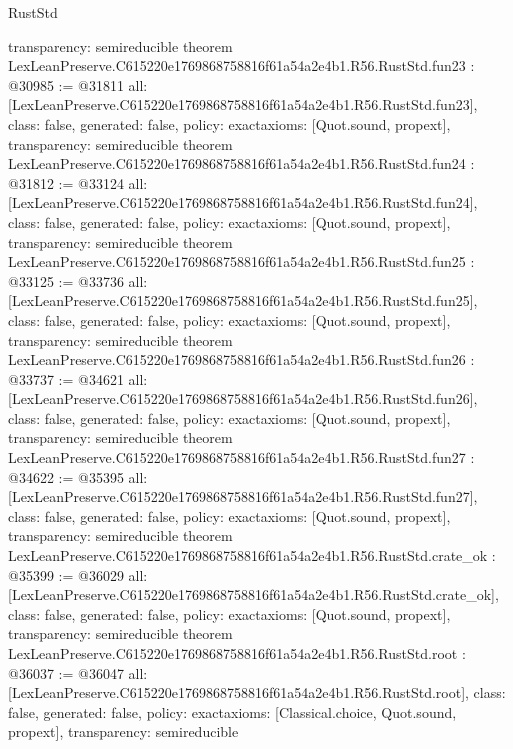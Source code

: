 \begin{lexlean}{RustStd}
\begin{coremodule}
{  transparency: semireducible
}
theorem LexLeanPreserve.C615220e1769868758816f61a54a2e4b1.R56.RustStd.fun23 : @30985 := @31811 {
  all: [LexLeanPreserve.C615220e1769868758816f61a54a2e4b1.R56.RustStd.fun23],
  class: false,
  generated: false,
  policy: exact{axioms: [Quot.sound, propext]},
  transparency: semireducible
}
theorem LexLeanPreserve.C615220e1769868758816f61a54a2e4b1.R56.RustStd.fun24 : @31812 := @33124 {
  all: [LexLeanPreserve.C615220e1769868758816f61a54a2e4b1.R56.RustStd.fun24],
  class: false,
  generated: false,
  policy: exact{axioms: [Quot.sound, propext]},
  transparency: semireducible
}
theorem LexLeanPreserve.C615220e1769868758816f61a54a2e4b1.R56.RustStd.fun25 : @33125 := @33736 {
  all: [LexLeanPreserve.C615220e1769868758816f61a54a2e4b1.R56.RustStd.fun25],
  class: false,
  generated: false,
  policy: exact{axioms: [Quot.sound, propext]},
  transparency: semireducible
}
theorem LexLeanPreserve.C615220e1769868758816f61a54a2e4b1.R56.RustStd.fun26 : @33737 := @34621 {
  all: [LexLeanPreserve.C615220e1769868758816f61a54a2e4b1.R56.RustStd.fun26],
  class: false,
  generated: false,
  policy: exact{axioms: [Quot.sound, propext]},
  transparency: semireducible
}
theorem LexLeanPreserve.C615220e1769868758816f61a54a2e4b1.R56.RustStd.fun27 : @34622 := @35395 {
  all: [LexLeanPreserve.C615220e1769868758816f61a54a2e4b1.R56.RustStd.fun27],
  class: false,
  generated: false,
  policy: exact{axioms: [Quot.sound, propext]},
  transparency: semireducible
}
theorem LexLeanPreserve.C615220e1769868758816f61a54a2e4b1.R56.RustStd.crate_ok : @35399 := @36029 {
  all: [LexLeanPreserve.C615220e1769868758816f61a54a2e4b1.R56.RustStd.crate_ok],
  class: false,
  generated: false,
  policy: exact{axioms: [Quot.sound, propext]},
  transparency: semireducible
}
theorem LexLeanPreserve.C615220e1769868758816f61a54a2e4b1.R56.RustStd.root : @36037 := @36047 {
  all: [LexLeanPreserve.C615220e1769868758816f61a54a2e4b1.R56.RustStd.root],
  class: false,
  generated: false,
  policy: exact{axioms: [Classical.choice, Quot.sound, propext]},
  transparency: semireducible
}


\end{coremodule}
\end{lexlean}
